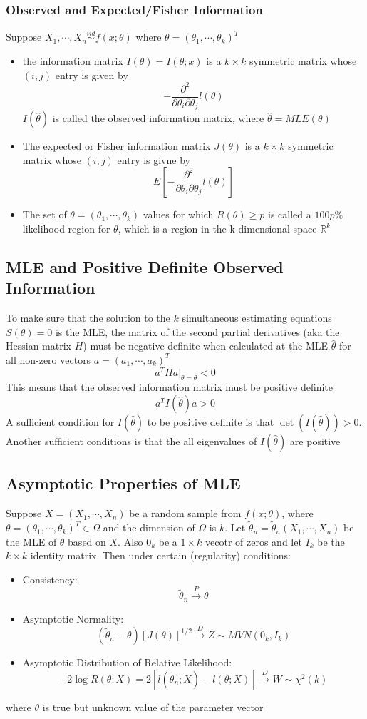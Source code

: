 \documentclass[11pt]{article}
\newcommand{\R}{{\mathbb{R}}}
\begin{document}
\subsubsection{Observed and Expected/Fisher Information}
Suppose $X_1,\cdots,X_n\overset{iid}{\sim}f(x;\theta)$ where $\theta=(\theta_1,\cdots,\theta_k)^T$
\begin{itemize}
    \item the information matrix $I(\theta)=I(\theta;x)$ is a $k\times k$ symmetric matrix whose $(i,j)$ entry is given by 
    \[-\frac{\partial^2}{\partial\theta_i\partial\theta_j}l(\theta)\]
    $I(\hat\theta)$ is called the observed information matrix, where $\hat\theta = MLE(\theta)$
    \item The expected or Fisher information matrix $J(\theta)$ is a $k\times k$ symmetric matrix whose $(i,j)$ entry is givne by 
    \[E\left[-\frac{\partial^2}{\partial\theta_i\partial\theta_j}l(\theta)\right]\]
    \item The set of $\theta=(\theta_1,\cdots,\theta_k)$ values for which $R(\theta)\geq p$ is called a $100p\%$ likelihood region for $\theta$, which is a region in the k-dimensional space $\R^k$
\end{itemize}
\subsection{MLE and Positive Definite Observed Information}
To make sure that the solution to the $k$ simultaneous estimating equations $S(\theta)=0$ is the MLE, the matrix of the second partial derivatives (aka the Hessian matrix $H$) must be 
negative definite when calculated at the MLE $\hat\theta$ for all non-zero vectors $a=(a_1,\cdots,a_k)^T$
\[a^THa|_{\theta=\hat\theta}<0\]
This means that the observed information matrix must be positive definite
\[a^TI(\hat\theta)a>0\]
A sufficient condition for $I(\hat\theta)$ to be positive definite is that $\det(I(\hat\theta))>0$. Another sufficient 
conditions is that the all eigenvalues of $I(\hat\theta)$ are positive
\subsection{Asymptotic Properties of MLE}
Suppose $X=(X_1,\cdots,X_n)$ be a random sample from $f(x;\theta)$, where $\theta=(\theta_1,\cdots,\theta_k)^T\in\Omega$ and
the dimension of $\Omega$ is $k$. Let $\tilde{\theta}_n=\tilde{\theta}_n(X_1,\cdots,X_n)$ be the MLE of $\theta$ based on $X$.
Also $0_k$ be a $1\times k$ vecotr of zeros and let $I_k$ be the $k\times k$ identity matrix. Then under certain (regularity) conditions:
\begin{itemize}
    \item Consistency: \[\tilde{\theta}_n\overset{P}{\rightarrow}\theta\]
    \item Asymptotic Normality: \[(\tilde{\theta}_n-\theta)\left[J(\theta)\right]^{1/2}\overset{D}{\rightarrow}Z\sim MVN(0_k,I_k)\]
    \item Asymptotic Distribution of Relative Likelihood: \[-2\log R(\theta;X)=2[l(\tilde{\theta}_n;X)-l(\theta;X)]\overset{D}{\rightarrow}W\sim\chi^2(k)\]
\end{itemize}
where $\theta$ is true but unknown value of the parameter vector 
\end{document}
